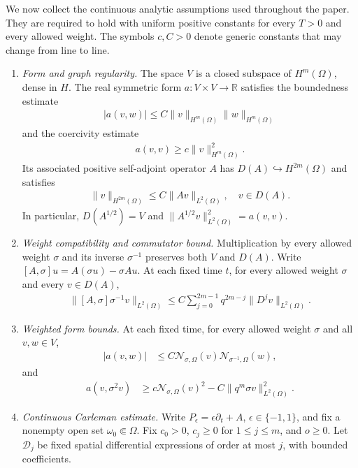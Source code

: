 \documentclass[print,wide,eng]{draft}
\begin{document}
We now collect the continuous analytic assumptions used throughout the paper. They are required to hold with uniform positive constants for every $T>0$ and every allowed weight. The symbols $c,C>0$ denote generic constants that may change from line to line.
%
\begin{enumerate}[label=\textbf{(A\arabic*)},ref=(A\arabic*)]
\item\label{ass:form} \emph{Form and graph regularity.}
The space $V$ is a closed subspace of $H^m(\Omega)$, dense in $H$.
The real symmetric form $a:V\times V\to\mathbb R$ satisfies the boundedness estimate
%
\begin{align*}
|a(v,w)|\leq C\|v\|_{H^m(\Omega)}\|w\|_{H^m(\Omega)}
\end{align*}
%
and the coercivity estimate
%
\begin{align*}
a(v,v)\geq c\|v\|_{H^m(\Omega)}^2.
\end{align*}
%
Its associated positive self-adjoint operator $A$ has $D(A)\hookrightarrow H^{2m}(\Omega)$ and satisfies
%
\begin{align}\label{eq:ellreg}
\|v\|_{H^{2m}(\Omega)}\leq C\|Av\|_{L^2(\Omega)},\quad v\in D(A).
\end{align}
%
In particular, $D(A^{1/2})=V$ and $\|A^{1/2}v\|_{L^2(\Omega)}^2=a(v,v)$.
\item\label{ass:localization} \emph{Weight compatibility and commutator bound.} Multiplication by every allowed weight $\sigma$ and its inverse $\sigma^{-1}$ preserves both $V$ and $D(A)$.
Write $[A,\sigma]u=A(\sigma u)-\sigma Au$. At each fixed time $t$, for every allowed weight $\sigma$ and every $v\in D(A)$,
%
\begin{align}\label{eq:commutator}
\|[A,\sigma]\sigma^{-1}v\|_{L^2(\Omega)}
\leq C\sum_{j=0}^{2m-1}q^{2m-j}\|D^jv\|_{L^2(\Omega)}.
\end{align}
%
\item\label{ass:weighted} \emph{Weighted form bounds.} At each fixed time, for every allowed weight $\sigma$ and all $v,w\in V$,
%
\begin{align}
|a(v,w)|&\leq C\mathcal N_{\sigma,\Omega}(v)\mathcal N_{\sigma^{-1},\Omega}(w),\label{eq:unshiftedformbound}
\end{align}
%
and
%
\begin{align}
a(v,\sigma^2v)&\geq c\mathcal N_{\sigma,\Omega}(v)^2-C\|q^m\sigma v\|_{L^2(\Omega)}^2.\label{eq:unshiftedcoercive}
\end{align}
%
\item\label{ass:carleman} \emph{Continuous Carleman estimate.} Write $P_\epsilon=\epsilon\partial_t+A$, $\epsilon\in\{-1,1\}$, and fix a nonempty open set $\omega_0\Subset\Omega$. Fix $c_0>0$, $c_j\geq0$ for $1\leq j\leq m$, and $o\geq0$. Let $\mathcal D_j$ be fixed spatial differential expressions of order at most $j$, with bounded coefficients.

\end{enumerate}
\end{document}
